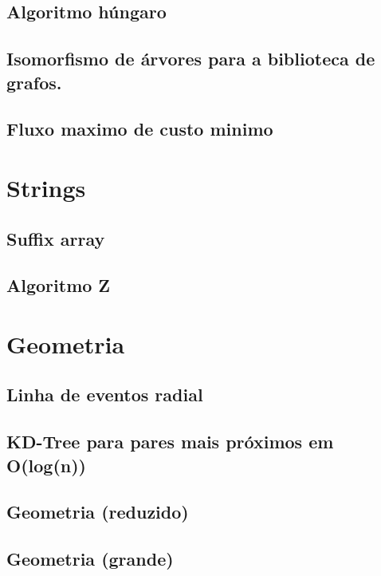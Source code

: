 \subsection{Algoritmo húngaro}
\raggedbottom
\hrulefill
\subsection{Isomorfismo de árvores para a biblioteca de grafos.}
\raggedbottom
\hrulefill
\subsection{Fluxo maximo de custo minimo}
\raggedbottom
\hrulefill
\clearpage
\section{Strings}
\subsection{Suffix array}
\raggedbottom
\hrulefill
\subsection{Algoritmo Z}
\raggedbottom
\hrulefill
\clearpage
\section{Geometria}
\subsection{Linha de eventos radial}
\raggedbottom
\hrulefill
\subsection{KD-Tree para pares mais próximos em O(log(n))}
\raggedbottom
\hrulefill
\subsection{Geometria (reduzido)}
\raggedbottom
\hrulefill
\subsection{Geometria (grande)}
\raggedbottom
\hrulefill
